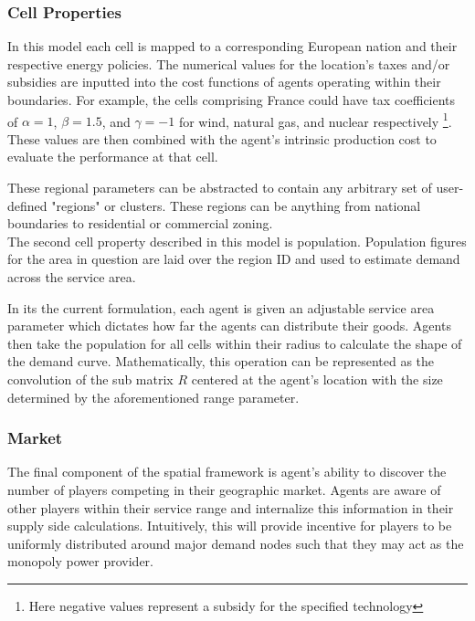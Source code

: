 \documentclass[12pt]{article}
\begin{document}

\subsubsection{Cell Properties}
In this model each cell is mapped to a corresponding European nation and their respective energy policies. The numerical values for the location's taxes and/or subsidies are inputted into the cost functions of agents operating within their boundaries. For example, the cells comprising France could have tax coefficients of $\alpha=1$, $\beta=1.5$, and $\gamma=-1$ for wind, natural gas, and nuclear respectively \footnote{Here negative values represent a subsidy for the specified technology}. These values are then combined with the agent's intrinsic production cost to evaluate the performance at that cell. \

These regional parameters can be abstracted to contain any arbitrary set of user-defined "regions" or clusters. These regions can be anything from national boundaries to residential or commercial zoning. \\

The second cell property described in this model is population. Population figures for the area in question are laid over the region ID and used to estimate demand across the service area. \ 

In its the current formulation, each agent is given an adjustable service area parameter which dictates how far the agents can distribute their goods. Agents then take the population for all cells within their radius to calculate the shape of the demand curve. Mathematically, this operation can be represented as the convolution of the sub matrix $R$ centered at the agent's location with the size determined by the aforementioned range parameter. 

\subsubsection{Market}
The final component of the spatial framework is agent's ability to discover the number of players competing in their geographic market. Agents are aware of other players within their service range and internalize this information in their supply side calculations. Intuitively, this will provide incentive for players to be uniformly distributed around major demand nodes such that they may act as the monopoly power provider.
\end{document}
